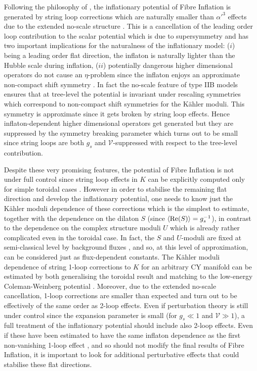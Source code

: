 \documentclass[11pt,a4paper]{article}
\newcommand\vo{{\mathcal{V}}}
\begin{document}
Following the philosophy of \cite{Cicoli:2008va}, the inflationary potential of Fibre Inflation is generated by string loop corrections which are naturally smaller than $\alpha'^3$ effects due to the extended no-scale structure \cite{Cicoli:2007xp}. This is a cancellation of the leading order loop contribution to the scalar potential which is due to supersymmetry and has two important implications for the naturalness of the inflationary model: ($i$) being a leading order flat direction, the inflaton is naturally lighter than the Hubble scale during inflation, ($ii$) potentially dangerous higher dimensional operators do not cause an $\eta$-problem since the inflaton enjoys an approximate non-compact shift symmetry \cite{Burgess:2014tja, Burgess:2016owb}. In fact the no-scale feature of type IIB models ensures that at tree-level the potential is invariant under rescaling symmetries which correspond to non-compact shift symmetries for the K\"ahler moduli. This symmetry is approximate since it gets broken by string loop effects. Hence inflaton-dependent higher dimensional operators get generated but they are suppressed by the symmetry breaking parameter which turns out to be small since string loops are both $g_s$ and $\vo$-suppressed with respect to the tree-level contribution. 

Despite these very promising features, the potential of Fibre Inflation is not under full control since string loop effects in $K$ can be explicitly computed only for simple toroidal cases \cite{Berg:2005ja}. However in order to stabilise the remaining flat direction and develop the inflationary potential, one needs to know just the K\"ahler moduli dependence of these corrections which is the simplest to estimate, together with the dependence on the dilaton $S$ (since $\langle {\rm Re} (S)\rangle = g_s^{-1}$), in contrast to the dependence on the complex structure moduli $U$ which is already rather complicated even in the toroidal case. In fact, the $S$ and $U$-moduli are fixed at semi-classical level by background fluxes \cite{Giddings:2001yu}, and so, at this level of approximation, can be considered just as flux-dependent constants. The K\"ahler moduli dependence of string 1-loop corrections to $K$ for an arbitrary CY manifold can be estimated by both generalising the toroidal result \cite{Berg:2007wt} and matching to the low-energy Coleman-Weinberg potential \cite{Cicoli:2007xp}. Moreover, due to the extended no-scale cancellation, 1-loop corrections are smaller than expected and turn out to be effectively of the same order as 2-loop effects. Even if perturbation theory is still under control since the expansion parameter is small (for $g_s\ll 1$ and $\vo \gg 1$), a full treatment of the inflationary potential should include also 2-loop effects. Even if these have been estimated to have the same inflaton dependence as the first non-vanishing 1-loop effect \cite{Cicoli:2008gp}, and so should not modify the final results of Fibre Inflation, it is important to look for additional perturbative effects that could stabilise these flat directions.
\end{document}

